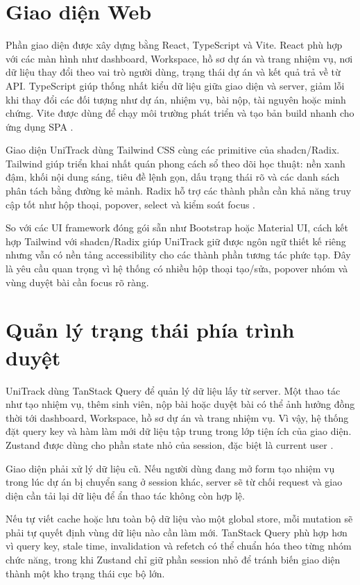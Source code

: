\section{Giao diện Web}

Phần giao diện được xây dựng bằng React, TypeScript và Vite. React phù hợp với các màn hình như dashboard, Workspace, hồ sơ dự án và trang nhiệm vụ, nơi dữ liệu thay đổi theo vai trò người dùng, trạng thái dự án và kết quả trả về từ API. TypeScript giúp thống nhất kiểu dữ liệu giữa giao diện và server, giảm lỗi khi thay đổi các đối tượng như dự án, nhiệm vụ, bài nộp, tài nguyên hoặc minh chứng. Vite được dùng để chạy môi trường phát triển và tạo bản build nhanh cho ứng dụng SPA \cite{react,typescript,vite}.

Giao diện UniTrack dùng Tailwind CSS cùng các primitive của shadcn/Radix. Tailwind giúp triển khai nhất quán phong cách sổ theo dõi học thuật: nền xanh đậm, khối nội dung sáng, tiêu đề lệnh gọn, dấu trạng thái rõ và các danh sách phân tách bằng đường kẻ mảnh. Radix hỗ trợ các thành phần cần khả năng truy cập tốt như hộp thoại, popover, select và kiểm soát focus \cite{tailwind,radix}.

So với các UI framework đóng gói sẵn như Bootstrap hoặc Material UI, cách kết hợp Tailwind với shadcn/Radix giúp UniTrack giữ được ngôn ngữ thiết kế riêng nhưng vẫn có nền tảng accessibility cho các thành phần tương tác phức tạp. Đây là yêu cầu quan trọng vì hệ thống có nhiều hộp thoại tạo/sửa, popover nhóm và vùng duyệt bài cần focus rõ ràng.

\section{Quản lý trạng thái phía trình duyệt}

UniTrack dùng TanStack Query để quản lý dữ liệu lấy từ server. Một thao tác như tạo nhiệm vụ, thêm sinh viên, nộp bài hoặc duyệt bài có thể ảnh hưởng đồng thời tới dashboard, Workspace, hồ sơ dự án và trang nhiệm vụ. Vì vậy, hệ thống đặt query key và hàm làm mới dữ liệu tập trung trong lớp tiện ích của giao diện. Zustand được dùng cho phần state nhỏ của session, đặc biệt là current user \cite{tanstackquery,zustand}.

Giao diện phải xử lý dữ liệu cũ. Nếu người dùng đang mở form tạo nhiệm vụ trong lúc dự án bị chuyển sang  ở session khác, server sẽ từ chối request và giao diện cần tải lại dữ liệu để ẩn thao tác không còn hợp lệ.

Nếu tự viết cache hoặc lưu toàn bộ dữ liệu vào một global store, mỗi mutation sẽ phải tự quyết định vùng dữ liệu nào cần làm mới. TanStack Query phù hợp hơn vì query key, stale time, invalidation và refetch có thể chuẩn hóa theo từng nhóm chức năng, trong khi Zustand chỉ giữ phần session nhỏ để tránh biến giao diện thành một kho trạng thái cục bộ lớn.

